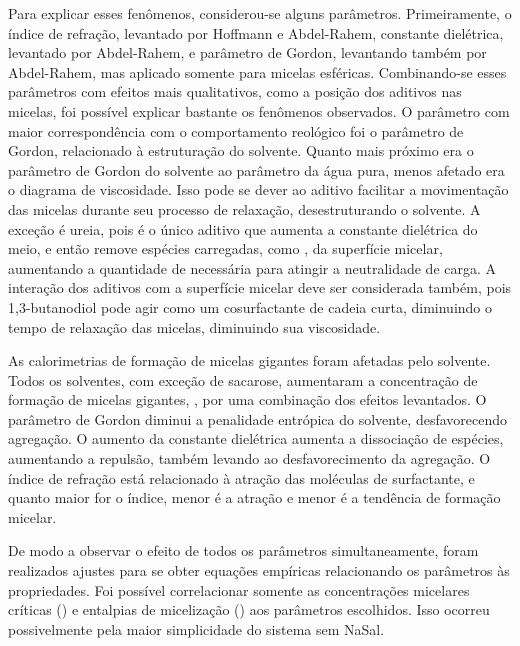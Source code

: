 		Para explicar esses fenômenos, considerou-se alguns parâmetros. Primeiramente, o índice de refração, levantado por Hoffmann e Abdel-Rahem, constante dielétrica, levantado por Abdel-Rahem, e parâmetro de Gordon, levantando também por Abdel-Rahem, mas aplicado somente para micelas esféricas. Combinando-se esses parâmetros com efeitos mais qualitativos, como a posição dos aditivos nas micelas, foi possível explicar bastante os fenômenos observados. O parâmetro com maior correspondência com o comportamento reológico foi o parâmetro de Gordon, relacionado à estruturação do solvente. Quanto mais próximo era o parâmetro de Gordon do solvente ao parâmetro da água pura, menos afetado era o diagrama de viscosidade. Isso pode se dever ao aditivo facilitar a movimentação das micelas durante seu processo de relaxação, desestruturando o solvente. A exceção é ureia, pois é o único aditivo que aumenta a constante dielétrica do meio, e então remove espécies carregadas, como \Sal, da superfície micelar, aumentando a quantidade de \Sal{} necessária para atingir a neutralidade de carga. A interação dos aditivos com a superfície micelar deve ser considerada também, pois 1,3-butanodiol pode agir como um cosurfactante de cadeia curta, diminuindo o tempo de relaxação das micelas, diminuindo sua viscosidade.
		
		As calorimetrias de formação de micelas gigantes foram afetadas pelo solvente. Todos os solventes, com exceção de sacarose, aumentaram a concentração de formação de micelas gigantes, \cwlm, por uma combinação dos efeitos levantados. O parâmetro de Gordon diminui a penalidade entrópica do solvente, desfavorecendo agregação. O aumento da constante dielétrica aumenta a dissociação de espécies, aumentando a repulsão, também levando ao desfavorecimento da agregação. O índice de refração está relacionado à atração das moléculas de surfactante, e quanto maior for o índice, menor é a atração e menor é a tendência de formação micelar.
		
		De modo a observar o efeito de todos os parâmetros simultaneamente, foram realizados ajustes para se obter equações empíricas relacionando os parâmetros às propriedades. Foi possível correlacionar somente as concentrações micelares críticas (\cmc) e entalpias de micelização (\DHmic) aos parâmetros escolhidos. Isso ocorreu possivelmente pela maior simplicidade do sistema sem NaSal.
		
